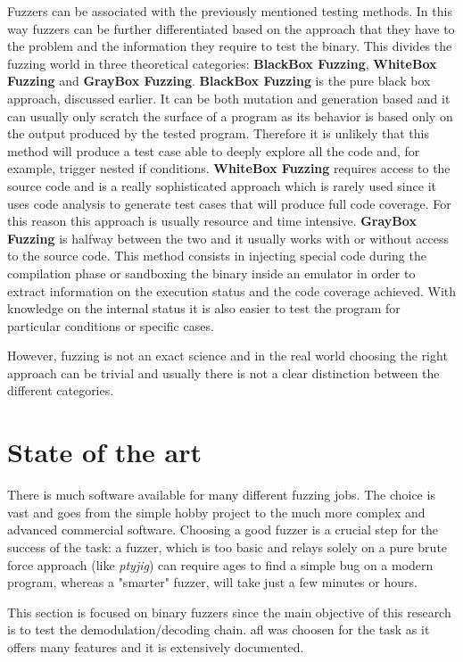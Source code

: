 \documentclass[../main.tex]{subfiles}
\begin{document}
Fuzzers can be associated with the previously mentioned testing methods. In this way fuzzers can be further differentiated based on the approach that they have to the problem and the information they require to test the binary. This divides the fuzzing world in three theoretical categories: \textbf{BlackBox Fuzzing}, \textbf{WhiteBox Fuzzing} and \textbf{GrayBox Fuzzing}. \textbf{BlackBox Fuzzing} is the pure black box approach, discussed earlier. It can be both mutation and generation based and it can usually only scratch the surface of a program as its behavior is based only on the output produced by the tested program. Therefore it is unlikely that this method will produce a test case able to deeply explore all the code and, for example, trigger nested if conditions. \textbf{WhiteBox Fuzzing} requires access to the source code and is a really sophisticated approach which is rarely used since it uses code analysis to generate test cases that will produce full code coverage. For this reason this approach is usually resource and time intensive. \textbf{GrayBox Fuzzing} is halfway between the two and it usually works with or without access to the source code. This method consists in injecting special code during the compilation phase or sandboxing the binary inside an emulator in order to extract information on the execution status and the code coverage achieved. With knowledge on the internal status it is also easier to test the program for particular conditions or specific cases.

However, fuzzing is not an exact science and in the real world choosing the right approach can be trivial and usually there is not a clear distinction between the different categories.


\section{State of the art}

There is much software available for many different fuzzing jobs. The choice is vast and goes from the simple hobby project to the much more complex and advanced commercial software. Choosing a good fuzzer is a crucial step for the success of the task: a fuzzer, which is too basic and relays solely on a pure brute force approach (like \textit{ptyjig}) can require ages to find a simple bug on a modern program, whereas a "smarter" fuzzer, will take just a few minutes or hours.

This section is focused on binary fuzzers since the main objective of this research is to test the demodulation/decoding chain. \acrlong{afl} was choosen for the task as it offers many features and it is extensively documented.
\end{document}
